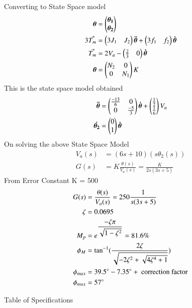 Converting to State Space model
\begin{align}
    \bm{\theta} &= \begin{pmatrix}\bm{\theta_{1}} \\ \bm{\theta_{2}}\end{pmatrix}
    \\
    3 \Vec{T_{m}} &= \begin{pmatrix}3J_{1} & J_{2}\end{pmatrix}\bm{\Ddot{\theta}}+ \begin{pmatrix}3f_{1} & f_{2}\end{pmatrix}\bm{\dot{\theta}}
    \\
    \Vec{T_{m}} &= 2V_{a} - \begin{pmatrix}\frac{2}{3} & 0\end{pmatrix}\bm{\dot{\theta}}
    \\
    \bm{\theta} &= \begin{pmatrix}N_{2} & 0 \\ 0& N_{1}\end{pmatrix} K
\end{align}
This is the state space model obtained
\begin{align}
    \bm{\Ddot{\theta}} &= \begin{pmatrix}\frac{-13}{6} & 0 \\ 0 &\frac{-5}{3}\end{pmatrix}\bm{\Dot{\theta}} + \begin{pmatrix}\frac{1}{2} \\ \frac{1}{6}\end{pmatrix}V_{a}
    \\
    \bm{\dot{\theta_{2}}} &= \begin{pmatrix}0 \\ 1\end{pmatrix}\bm{\dot{\theta}} 
\end{align}
On solving the above State Space Model
\begin{align}
    V_{a}(s) &= (6s+10)(s\theta_{2}(s)) \label{eq:ee18btech11001_6}
    \\
    G(s) &=  K \frac{\theta (s)}{V_{a}(s)} = \frac{K}{2s(3s+5)} \label{eq:ee18btech11001_7}
\end{align}
From Error Constant  K = 500
\begin{align}
   G(s) &=  \frac{\theta (s)}{V_{a}(s)} = 250 \frac{1}{s(3s+5)} \label{eq:ee18btech11001_8}
   \\
   \zeta &= 0.0695
   \\
   M_{p} &= e^{\dfrac{-\zeta\pi}{\sqrt{1-\zeta^{2}}}} = 81.6\%
   \\
   \phi_{M} &= \tan^{-1}(\dfrac{2\zeta}{\sqrt{-2\zeta^2 + \sqrt{4\zeta^4 + 1}}})
   \\
   \phi_{max} &= 39.5\degree-7.35\degree+ \text{ correction factor}
   \\
   \phi_{max} &= 57\degree
\end{align}
\begin{table}[!ht]
\centering

\caption{Table of Specifications}
\label{table:ee18btech11001}
\end{table}

